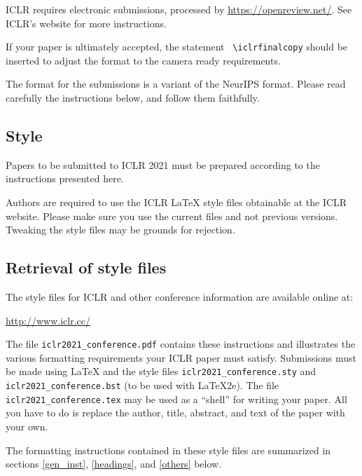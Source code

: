 \documentclass{article} %
\begin{document}
ICLR requires electronic submissions, processed by
\url{https://openreview.net/}. See ICLR's website for more instructions.

If your paper is ultimately accepted, the statement {\tt
  {\textbackslash}iclrfinalcopy} should be inserted to adjust the
format to the camera ready requirements.

The format for the submissions is a variant of the NeurIPS format.
Please read carefully the instructions below, and follow them
faithfully.

\subsection{Style}

Papers to be submitted to ICLR 2021 must be prepared according to the
instructions presented here.


Authors are required to use the ICLR \LaTeX{} style files obtainable at the
ICLR website. Please make sure you use the current files and
not previous versions. Tweaking the style files may be grounds for rejection.

\subsection{Retrieval of style files}

The style files for ICLR and other conference information are available online at:
\begin{center}
   \url{http://www.iclr.cc/}
\end{center}
The file \verb+iclr2021_conference.pdf+ contains these
instructions and illustrates the
various formatting requirements your ICLR paper must satisfy.
Submissions must be made using \LaTeX{} and the style files
\verb+iclr2021_conference.sty+ and \verb+iclr2021_conference.bst+ (to be used with \LaTeX{}2e). The file
\verb+iclr2021_conference.tex+ may be used as a ``shell'' for writing your paper. All you
have to do is replace the author, title, abstract, and text of the paper with
your own.

The formatting instructions contained in these style files are summarized in
sections \ref{gen_inst}, \ref{headings}, and \ref{others} below.
\end{document}
